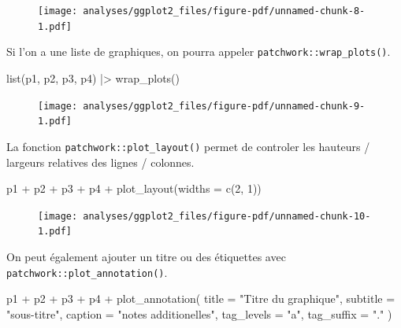 \documentclass[
  letterpaper,
  DIV=11,
  numbers=noendperiod,
  oneside]{scrreprt}
\newenvironment{Shaded}{\begin{snugshade}}{\end{snugshade}}
\newcommand{\AttributeTok}[1]{\textcolor[rgb]{0.40,0.45,0.13}{#1}}
\newcommand{\DecValTok}[1]{\textcolor[rgb]{0.68,0.00,0.00}{#1}}
\newcommand{\FunctionTok}[1]{\textcolor[rgb]{0.28,0.35,0.67}{#1}}
\newcommand{\NormalTok}[1]{\textcolor[rgb]{0.00,0.23,0.31}{#1}}
\newcommand{\SpecialCharTok}[1]{\textcolor[rgb]{0.37,0.37,0.37}{#1}}
\newcommand{\StringTok}[1]{\textcolor[rgb]{0.13,0.47,0.30}{#1}}
\begin{document}
\begin{figure}[H]

{\centering \texttt{[image: analyses/ggplot2\_files/figure-pdf/unnamed-chunk-8-1.pdf]}

}

\end{figure}

Si l'on a une liste de graphiques, on pourra appeler
\texttt{patchwork::wrap\_plots()}.

\begin{Shaded}
\begin{Highlighting}[]
\FunctionTok{list}\NormalTok{(p1, p2, p3, p4) }\SpecialCharTok{|\textgreater{}} 
  \FunctionTok{wrap\_plots}\NormalTok{()}
\end{Highlighting}
\end{Shaded}

\begin{figure}[H]

{\centering \texttt{[image: analyses/ggplot2\_files/figure-pdf/unnamed-chunk-9-1.pdf]}

}

\end{figure}

La fonction \texttt{patchwork::plot\_layout()} permet de controler les
hauteurs / largeurs relatives des lignes / colonnes.

\begin{Shaded}
\begin{Highlighting}[]
\NormalTok{p1 }\SpecialCharTok{+}\NormalTok{ p2 }\SpecialCharTok{+}\NormalTok{ p3 }\SpecialCharTok{+}\NormalTok{ p4 }\SpecialCharTok{+} \FunctionTok{plot\_layout}\NormalTok{(}\AttributeTok{widths =} \FunctionTok{c}\NormalTok{(}\DecValTok{2}\NormalTok{, }\DecValTok{1}\NormalTok{))}
\end{Highlighting}
\end{Shaded}

\begin{figure}[H]

{\centering \texttt{[image: analyses/ggplot2\_files/figure-pdf/unnamed-chunk-10-1.pdf]}

}

\end{figure}

On peut également ajouter un titre ou des étiquettes avec
\texttt{patchwork::plot\_annotation()}.

\begin{Shaded}
\begin{Highlighting}[]
\NormalTok{p1 }\SpecialCharTok{+}\NormalTok{ p2 }\SpecialCharTok{+}\NormalTok{ p3 }\SpecialCharTok{+}\NormalTok{ p4 }\SpecialCharTok{+}
  \FunctionTok{plot\_annotation}\NormalTok{(}
    \AttributeTok{title =} \StringTok{"Titre du graphique"}\NormalTok{,}
    \AttributeTok{subtitle =} \StringTok{"sous{-}titre"}\NormalTok{,}
    \AttributeTok{caption =} \StringTok{"notes additionelles"}\NormalTok{,}
    \AttributeTok{tag\_levels =} \StringTok{"a"}\NormalTok{,}
    \AttributeTok{tag\_suffix =} \StringTok{"."}
\NormalTok{  )}
\end{Highlighting}
\end{Shaded}
\end{document}
